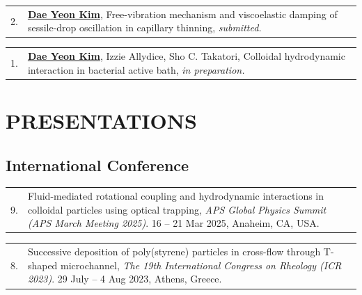\documentclass[11pt, a4paper]{article}
\makeatletter
\newenvironment{pubitem}[2]{%
  \begin{tabularx}{\textwidth}{@{}p{1cm}X@{}}
  #1 & #2 \\
  \end{tabularx}
}{}
\makeatother
\begin{document}
    \vspace{0.3em}

    \begin{pubitem}{2.}{\textbf{\underline{Dae Yeon Kim}},
    Free-vibration mechanism and viscoelastic damping of sessile-drop oscillation in capillary thinning, \textit{submitted.}}
    \end{pubitem}

    \vspace{0.3em}

    \begin{pubitem}{1.}{\textbf{\underline{Dae Yeon Kim}}, Izzie Allydice, Sho C. Takatori,
    Colloidal hydrodynamic interaction in bacterial active bath, \textit{in preparation.}}
    \end{pubitem}

    \vspace{0.3em}

    
    
    


   
       


    
    \section{PRESENTATIONS}
    \subsection{International Conference}

    \begin{pubitem}{9.}{Fluid-mediated rotational coupling and hydrodynamic interactions in colloidal particles using optical trapping, 
    \textit{APS Global Physics Summit (APS March Meeting 2025)}. 16 – 21 Mar 2025, Anaheim, CA, USA.}
    \end{pubitem}
    
    \vspace{0.3em}
    
    \begin{pubitem}{8.}{Successive deposition of poly(styrene) particles in cross-flow through T-shaped microchannel, 
    \textit{The 19th International Congress on Rheology (ICR 2023)}. 29 July – 4 Aug 2023, Athens, Greece.}
    \end{pubitem}
    
\end{document}
